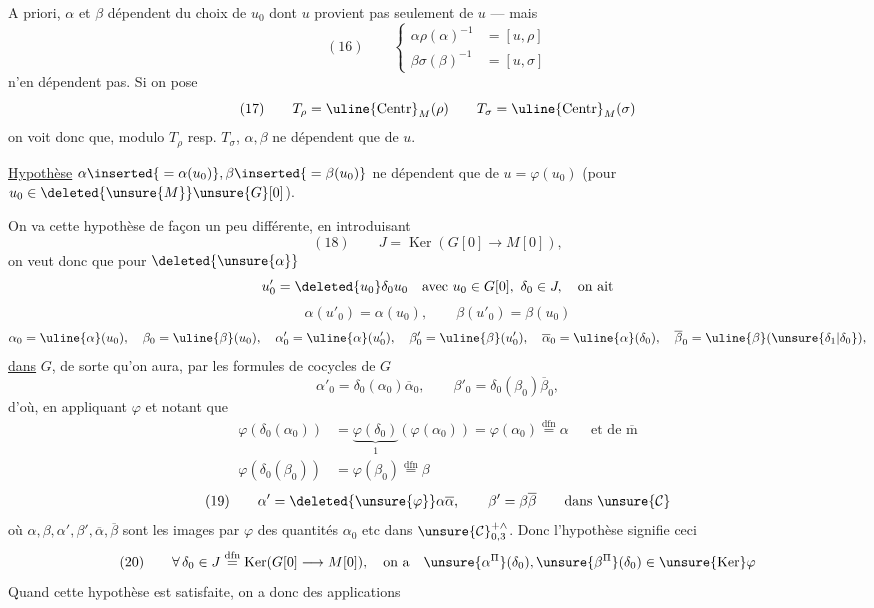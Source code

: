 
A priori, $\alpha$ et $\beta$ dépendent du choix de $u_0$ dont $u$ provient
pas seulement de $u$ --- mais
\[
(16)\qquad
\left\{\begin{aligned}
\alpha\rho(\alpha)^{-1}&=[u,\rho]\\
\beta\sigma(\beta)^{-1}&=[u,\sigma]
\end{aligned}\right.
\]
n'en dépendent pas. Si on pose
\[
(17)\qquad
T_{\rho}=\uline{\mathrm{Centr}}_M(\rho)
\qquad
T_{\sigma}=\uline{\mathrm{Centr}}_M(\sigma)
\]
on voit donc que, modulo $T_{\rho}$ resp. $T_{\sigma}$,
$\alpha,\beta$ ne dépendent que de $u$.

\uline{Hypothèse}
$\alpha\inserted{{}=\alpha(u_0)},\beta\inserted{{}=\beta(u_0)}$
ne dépendent que de $u=\varphi(u_0)$
(pour $u_0\in\deleted{\unsure{M}}\unsure{G}[0]$).

On va  cette hypothèse de façon un peu différente,
en introduisant
\[
(18)\qquad J=\operatorname{Ker}(G[0]\longrightarrow M[0]),
\]
on veut donc que pour $\deleted{\unsure{\alpha}}$
\[
u'_0=\deleted{u_0}\delta_0u_0\quad
\text{avec }u_0\in G[0],\ \delta_0\in J,\quad\text{on ait}
\]
\[
\alpha(u'_0)=\alpha(u_0),\qquad \beta(u'_0)=\beta(u_0)
\]
\[
\begin{gathered}
\alpha_0=\uline{\alpha}(u_0),\quad
\beta_0=\uline{\beta}(u_0),\quad
\alpha'_0=\uline{\alpha}(u'_0),\quad
\beta'_0=\uline{\beta}(u'_0),\quad
\overline{\alpha}_0=\uline{\alpha}(\delta_0),\quad
\overline{\beta}_0=\uline{\beta}(\unsure{\delta_1|\delta_0}),
\end{gathered}
\]
\uline{dans} $G$, de sorte qu'on aura, par les formules de cocycles de $G$
\[
\alpha'_0=\delta_0(\alpha_0)\overline{\alpha}_0,
\qquad
\beta'_0=\delta_0(\beta_0)\overline{\beta}_0,
\]
d'où, en appliquant $\varphi$ et notant que
\[
\begin{aligned}
\varphi(\delta_0(\alpha_0))
&=\underbrace{\varphi(\delta_0)}_{1}(\varphi(\alpha_0))
=\varphi(\alpha_0)\overset{\mathrm{dfn}}=\alpha
&&\text{et de }\overline{\mathrm m}\\
\varphi(\delta_0(\beta_0))&=\varphi(\beta_0)\overset{\mathrm{dfn}}=\beta
\end{aligned}
\]
\[
(19)\qquad
\alpha'=\deleted{\unsure{\varphi}}\alpha\overline{\alpha},\qquad
\beta'=\beta\overline{\beta}\qquad\text{dans }\unsure{\mathcal{C}}
\]
où $\alpha,\beta,\alpha',\beta',\overline{\alpha},\overline{\beta}$ sont les images par
$\varphi$ des quantités $\alpha_0$ etc dans $\unsure{\mathcal{C}}_{0,3}^{+\wedge}$.
Donc l'hypothèse signifie ceci
\[
(20)\qquad
\forall\,\delta_0\in J\overset{\mathrm{dfn}}=
\operatorname{Ker}(G[0]\longrightarrow M[0]),\quad
\text{on a}\quad
\unsure{\alpha^{\Pi}}(\delta_0),\unsure{\beta^{\Pi}}(\delta_0)
\in\unsure{\operatorname{Ker}}\varphi
\]
Quand cette hypothèse est satisfaite, on a donc des applications

